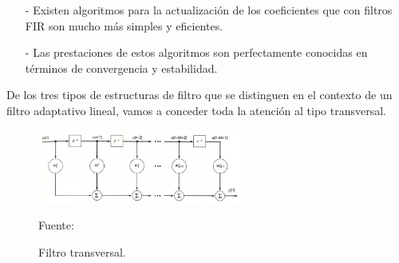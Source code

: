 \begin{enumerate}
\begin{enumerate}
\begin{enumerate}
\item[-]Existen algoritmos para la actualización de los coeficientes que con filtros FIR son mucho más simples y eficientes.
\item[-]Las prestaciones de estos algoritmos son perfectamente conocidas en términos de convergencia y estabilidad.
\end{enumerate}
De los tres tipos de estructuras de filtro que se distinguen en el contexto de un filtro adaptativo lineal, vamos a conceder toda la atención al tipo transversal.
\begin{figure}[ht]
\begin{center}
\includegraphics[width=0.6\textwidth]{Imagenes/Cap2/image016}
\end{center}
\begin{center}
\vskip -0.5cm
\caption{\small{Filtro transversal.}}
\label{fig:figura2.16}
{\small{Fuente: \cite{walter}}}
\end{center}
\end{figure}


\end{enumerate}
\end{enumerate}
